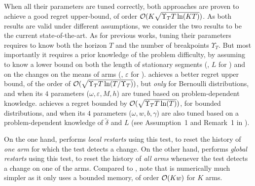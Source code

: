 When all their parameters are tuned correctly, both approaches are proven to achieve a good regret upper-bound, of order $\mathcal{O}(K \sqrt{\Upsilon_T T \ln(K T)})$.
As both results are valid under different assumptions, we consider the two results to be the current state-of-the-art.
As for previous works, tuning their parameters requires to know both the horizon $T$ and the number of breakpoints $\Upsilon_T$.
But most importantly it requires a prior knowledge of the problem difficulty, by assuming to know a lower bound on both the length of stationary segments (\eg, $L$ for \MUCB) and on the changes on the means of arms (\eg, $\varepsilon$ for \CUSUM).
%
\CUSUMUCB{} achieves a better regret upper bound, of the order of $\mathcal{O}(\sqrt{\Upsilon_T T \ln(T / \Upsilon_T)})$, but \emph{only} for Bernoulli distributions,
and when its $4$ parameters ($\omega,\varepsilon,M,h$) are tuned based on problem-dependent knowledge.
%
\MUCB{} achieves a regret bounded by $\mathcal{O}(\sqrt{\Upsilon_T T \ln(T)})$, for bounded distributions, and when its $4$ parameters ($\omega,w,b,\gamma$) are also tuned based on a problem-dependent knowledge of $\tilde{\delta}$ and $L$ (see Assumption~1 and Remark~1 in \cite{CaoZhenKvetonXie18}).


On the one hand, \CUSUMUCB{} performs \emph{local restarts} using this test, to reset the history of \emph{one arm} for which the test detects a change.
On the other hand, \MUCB{} performs \emph{global restarts} using this test, to reset the history of \emph{all arms} whenever the test detects a change on one of the arms.
Compared to \CUSUMUCB{}, note that \MUCB{} is numerically much simpler as it only uses a bounded memory, of order $\mathop{}\mathopen{}\mathcal{O}\mathopen{}\left(K w\right)$ for $K$ arms.

